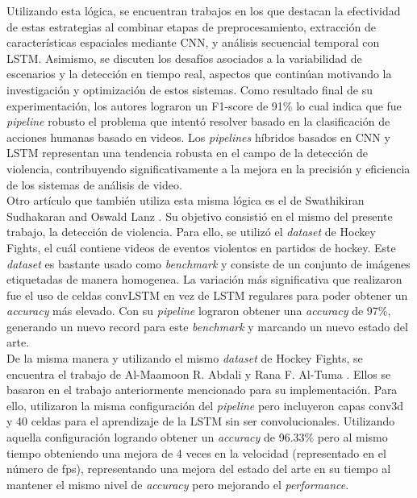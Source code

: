 Utilizando esta lógica, se encuentran trabajos\cite{Orozco2021} en los que 
destacan la efectividad de estas estrategias al combinar 
etapas de preprocesamiento, extracción de características 
espaciales mediante CNN, y análisis secuencial temporal con 
LSTM. Asimismo, se discuten los desafíos asociados a la 
variabilidad de escenarios y la detección en tiempo real, 
aspectos que continúan motivando la investigación y 
optimización de estos sistemas. Como resultado final de su 
experimentación, los autores lograron un F1-score de 91\% 
lo cual indica que fue \textit{pipeline} robusto el 
problema que intentó resolver basado en la clasificación de 
acciones humanas basado en videos. Los \textit{pipelines} híbridos 
basados en CNN y LSTM representan una tendencia robusta en 
el campo de la detección de violencia, contribuyendo 
significativamente a la mejora en la precisión y eficiencia 
de los sistemas de análisis de video.\\

Otro artículo que también utiliza esta misma lógica es el de
Swathikiran Sudhakaran and Oswald Lanz \cite{Sudhakaran2017}. Su objetivo consistió 
en el mismo del presente trabajo, la detección de violencia. 
Para ello, se utilizó el \textit{dataset} de Hockey Fights, 
el cuál contiene videos de eventos violentos en partidos de 
hockey. Este \textit{dataset} es bastante usado como \textit{benchmark} 
y consiste de un conjunto de imágenes etiquetadas de manera 
homogenea. La variación más significativa que realizaron fue el 
uso de celdas convLSTM en vez de LSTM regulares para poder 
obtener un \textit{accuracy} más elevado. Con su \textit{pipeline} 
lograron obtener una \textit{accuracy} de 97\%, generando un 
nuevo record para este \textit{benchmark} y marcando un nuevo 
estado del arte. \\

De la misma manera y utilizando el mismo \textit{dataset} de 
Hockey Fights, se encuentra el trabajo de Al-Maamoon R. Abdali 
y Rana F. Al-Tuma \cite{Abdali2019}. Ellos se basaron en el 
trabajo anteriormente mencionado para su implementación. 
Para ello, utilizaron la misma configuración del 
\textit{pipeline} pero incluyeron capas 
conv3d y 40 celdas para el aprendizaje de la LSTM sin ser 
convolucionales. Utilizando aquella configuración logrando 
obtener un \textit{accuracy} de 96.33\% 
pero al mismo tiempo obteniendo una mejora de 4 veces en la 
velocidad (representado en el número de fps), representando 
una mejora del estado del arte en su tiempo al mantener el 
mismo nivel de \textit{accuracy} pero mejorando el 
\textit{performance}.\\

